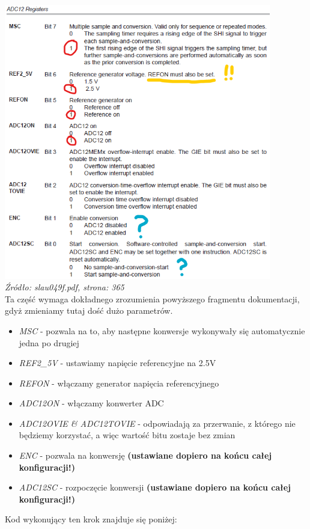 \documentclass{article}
\begin{document}
\begin{enumerate}[label=\arabic*.]
\includegraphics[width=0.875\textwidth]{"../adc_img/slau049f_365.png"} \\
\textit{Źródło: slau049f.pdf, strona: 365}
\vspace{3mm} \\
Ta część wymaga dokładnego zrozumienia powyższego fragmentu dokumentacji, gdyż zmieniamy tutaj dość dużo parametrów.
\begin{itemize}
     \item \textit{MSC} - pozwala na to, aby następne konwersje wykonywały się automatycznie jedna po drugiej
     \item \textit{REF2\_5V} - ustawiamy napięcie referencyjne na 2.5V
     \item \textit{REFON} - włączamy generator napięcia referencyjnego
     \item \textit{ADC12ON} - włączamy konwerter ADC
     \item \textit{ADC12OVIE \& ADC12TOVIE} - odpowiadają za przerwanie, z którego nie będziemy korzystać, a więc wartość bitu zostaje bez zmian
     \item \textit{ENC} - pozwala na konwersję \textbf{(ustawiane dopiero na końcu całej konfiguracji!)}
     \item \textit{ADC12SC} - rozpoczęcie konwersji \textbf{(ustawiane dopiero na końcu całej konfiguracji!)}
\end{itemize}
Kod wykonujący ten krok znajduje się poniżej:
\begin{verbatim}

\end{verbatim}
\end{enumerate}
\end{document}
